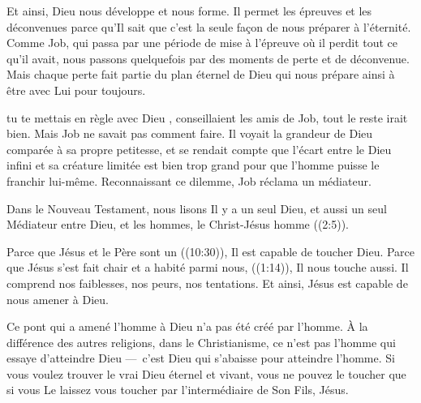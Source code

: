 Et ainsi, Dieu nous développe et nous forme.
 Il permet les épreuves et les déconvenues parce qu'Il sait
 que c'est la seule façon de nous préparer à l'éternité.
 Comme Job, qui passa par une période de mise à l'épreuve
 où il perdit tout ce qu'il avait, nous passons quelquefois
 par des moments de perte et de déconvenue.
 Mais chaque perte fait partie du plan éternel de Dieu
 qui nous prépare ainsi à être avec Lui pour toujours. 

\dvrule






 tu te mettais en règle avec Dieu \fg{},
 conseillaient les amis de Job, \og tout le reste irait bien. \fg{}
 Mais Job ne savait pas comment faire.
 Il voyait la grandeur de Dieu comparée à sa propre petitesse,
 et se rendait compte que l'écart entre le Dieu infini
 et sa créature limitée est bien trop grand pour que l'homme
 puisse le franchir lui-même.
 Reconnaissant ce dilemme, Job réclama un médiateur.

Dans le Nouveau Testament, nous lisons \og Il y a un seul Dieu,
 et aussi un seul Médiateur entre Dieu, et les hommes,
 le Christ-Jésus homme \fg{} ((2:5)).


Parce que Jésus et le Père sont un ((10:30)),
 Il est capable de toucher Dieu.
 Parce que Jésus \og s'est fait chair et a habité parmi nous, \fg{}
 ((1:14)), Il nous touche aussi.
 Il comprend nos faiblesses, nos peurs, nos tentations.
 Et ainsi, Jésus est capable de nous amener à Dieu.

Ce pont qui a amené l'homme à Dieu n'a pas été créé par l'homme.
 À la différence des autres religions, dans le Christianisme,
 ce n'est pas l'homme qui essaye d'atteindre Dieu
 ---~c'est Dieu qui s'abaisse pour atteindre l'homme.
 Si vous voulez trouver le vrai Dieu éternel et vivant,
 vous ne pouvez le toucher que si vous Le laissez vous toucher
 par l'intermédiaire de Son Fils, Jésus. 

